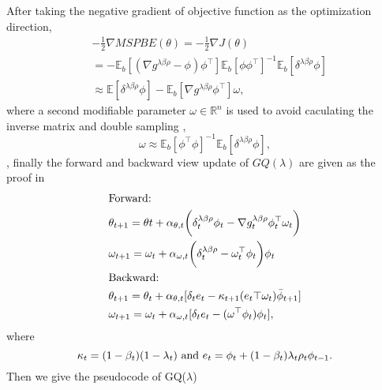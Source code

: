 \documentclass[conference]{IEEEtran}
\begin{document}
After taking the negative gradient of objective function as the optimization direction,
\begin{equation}
\begin{split}
  &-\frac{1}{2}\nabla MSPBE(\theta) =-\frac{1}{2}\nabla J(\theta) \\
  &= -\mathbb{E}_b[(\nabla g^{\lambda \beta\rho} - \phi) \phi^\top ]\mathbb{E}_b[\phi\phi^\top ]^{-1}\mathbb{E}_b[\delta^{\lambda\beta\rho}\phi]\\
  &\approx \mathbb{E}[\delta^{\lambda\beta\rho}\phi]-\mathbb{E}_b[\nabla g^{\lambda \beta\rho}\phi^\top ]\omega,
  \end{split}
\end{equation}
where a second modifiable parameter $\omega\in\mathbb{R}^n$ is used to avoid caculating the inverse matrix and double sampling \cite{sutton1998reinforcement},
\begin{equation}
  \omega\approx \mathbb{E}_b[\phi^\top \phi]^{-1}\mathbb{E}_b[\delta^{\lambda\beta\rho}\phi],
\end{equation}
, finally the forward and backward view update of $GQ(\lambda)$ are given as the proof in \cite{maei2010gq}
\begin{equation}
\begin{split}
  &\textup{Forward:}\\
  &\theta_{t+1}=\theta{t}+\alpha_{\theta, t}\bigg(\delta^{\lambda\beta\rho}_t\phi_t-\nabla g^{\lambda\beta\rho}_t\phi_t^\top\omega_t\bigg)\\
  &\omega_{t+1}=\omega_t+\alpha_{\omega, t}\bigg(\delta^{\lambda\beta\rho}_t-\omega_t^\top\phi_t\bigg)\phi_t\\
  &\textup{Backward:}\\
  &\theta_{t+1}=\theta_t+\alpha_{\theta, t}[\delta_te_t-\kappa_{t+1}({e_t}\top \omega_{t}){\bar{\phi}}_{t+1}]\\
  &\omega_{t+1}=\omega_{t}+\alpha_{\omega, t}[\delta_te_t-(\omega^\top\phi_t)\phi_t],
\end{split}
\end{equation}
where
\begin{equation}
\kappa_t=(1-\beta_t)(1-\lambda_t) \ \textup{and} \ e_t=\phi_t+(1-\beta_t)\lambda_t\rho_t\phi_{t-1}.
\end{equation}
Then we give the pseudocode of GQ($\lambda$)\\
\end{document}
